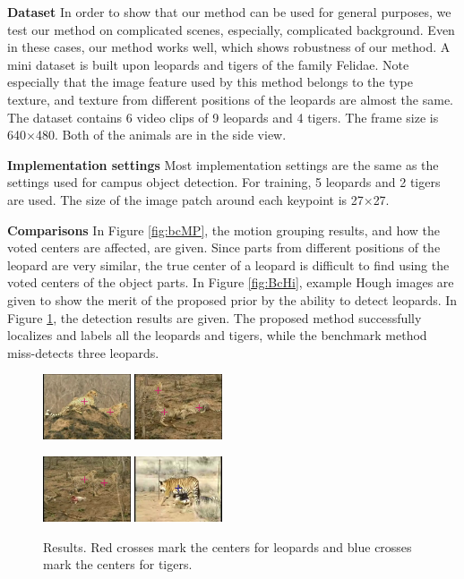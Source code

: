 \documentclass{mva2011}
\begin{document}
\textbf{Dataset} In order to show that our method can be used for general purposes, we test our method on complicated scenes, especially, complicated background.  Even in these cases, our method works well, which shows robustness of our method. A mini dataset is built upon leopards and tigers of the family Felidae. Note especially that the image feature used by this method belongs to the type texture, and texture from different  positions of the leopards are almost the same. The dataset contains 6 video clips of 9 leopards and 4 tigers. The frame size is 640$\times$480. Both of the animals are in the side view.

\textbf{Implementation settings} Most implementation settings are the same as the settings used for campus object detection. For training, 5 leopards and 2 tigers are used. The size of the image patch around each keypoint is 27$\times$27.




\textbf{Comparisons} In Figure \ref{fig:bcMP}, the motion grouping results, and how the voted centers are affected, are given. Since parts from different positions of the leopard are very similar, the true center of a leopard is difficult to find using the voted centers of the object parts. In Figure \ref{fig:BcHi}, example Hough images are given to show the merit of the proposed prior by the ability to detect leopards. In Figure \ref{fig:bgdr}, the detection results are given. The proposed method successfully localizes and labels all the leopards and tigers, while the benchmark method miss-detects three leopards.

\begin{figure}
\centering
\includegraphics[width=0.23\textwidth,bb=0 0 640 480]{leo1.jpg}
\includegraphics[width=0.23\textwidth,bb=0 0 640 480]{leo2.jpg}

\includegraphics[width=0.23\textwidth,bb=0 0 640 480]{leo3.jpg}
\includegraphics[width=0.23\textwidth,bb=0 0 640 480]{ti1.jpg}

\caption{Results. Red crosses mark the centers for leopards and blue crosses mark the centers for tigers.}
\label{fig:bgdr}
\end{figure}
\end{document}
